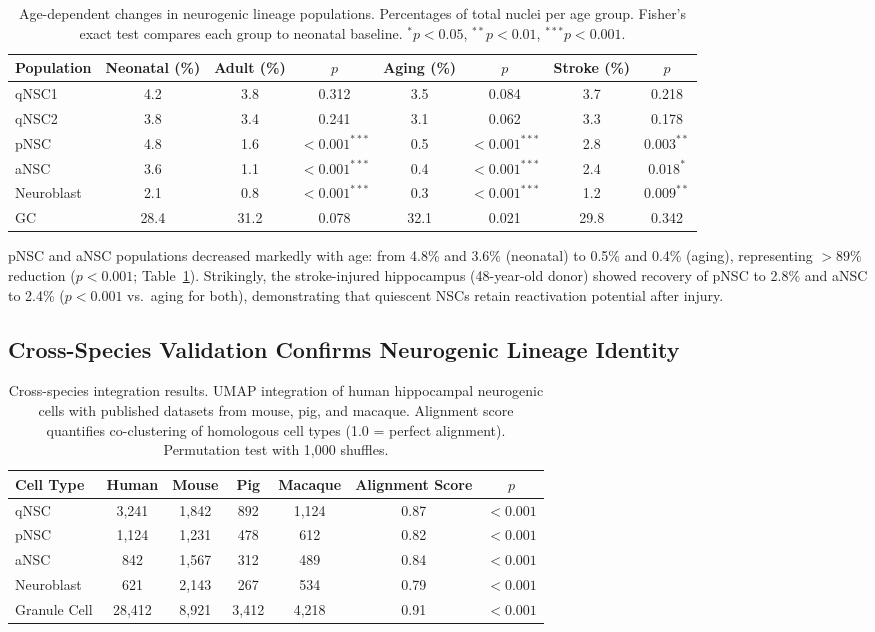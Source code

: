 \documentclass[11pt]{article}
\begin{document}
\begin{table}[H]
\centering
\caption{Age-dependent changes in neurogenic lineage populations. Percentages of total nuclei per age group. Fisher's exact test compares each group to neonatal baseline. $^{*}p < 0.05$, $^{**}p < 0.01$, $^{***}p < 0.001$.}
\label{tab:age_changes}
\begin{tabular}{lccccccc}
\toprule
Population & Neonatal (\%) & Adult (\%) & $p$ & Aging (\%) & $p$ & Stroke (\%) & $p$ \\
\midrule
qNSC1 & 4.2 & 3.8 & 0.312 & 3.5 & 0.084 & 3.7 & 0.218 \\
qNSC2 & 3.8 & 3.4 & 0.241 & 3.1 & 0.062 & 3.3 & 0.178 \\
pNSC & 4.8 & 1.6 & $< 0.001^{***}$ & 0.5 & $< 0.001^{***}$ & 2.8 & $0.003^{**}$ \\
aNSC & 3.6 & 1.1 & $< 0.001^{***}$ & 0.4 & $< 0.001^{***}$ & 2.4 & $0.018^{*}$ \\
Neuroblast & 2.1 & 0.8 & $< 0.001^{***}$ & 0.3 & $< 0.001^{***}$ & 1.2 & $0.009^{**}$ \\
GC & 28.4 & 31.2 & 0.078 & 32.1 & 0.021 & 29.8 & 0.342 \\
\bottomrule
\end{tabular}
\end{table}

pNSC and aNSC populations decreased markedly with age: from 4.8\% and 3.6\% (neonatal) to 0.5\% and 0.4\% (aging), representing $> 89\%$ reduction ($p < 0.001$; Table~\ref{tab:age_changes}). Strikingly, the stroke-injured hippocampus (48-year-old donor) showed recovery of pNSC to 2.8\% and aNSC to 2.4\% ($p < 0.001$ vs.\ aging for both), demonstrating that quiescent NSCs retain reactivation potential after injury.

\subsection{Cross-Species Validation Confirms Neurogenic Lineage Identity}

\begin{table}[H]
\centering
\caption{Cross-species integration results. UMAP integration of human hippocampal neurogenic cells with published datasets from mouse, pig, and macaque. Alignment score quantifies co-clustering of homologous cell types (1.0 = perfect alignment). Permutation test with 1,000 shuffles.}
\label{tab:cross_species}
\begin{tabular}{lcccccc}
\toprule
Cell Type & Human & Mouse & Pig & Macaque & Alignment Score & $p$ \\
\midrule
qNSC & 3,241 & 1,842 & 892 & 1,124 & 0.87 & $< 0.001$ \\
pNSC & 1,124 & 1,231 & 478 & 612 & 0.82 & $< 0.001$ \\
aNSC & 842 & 1,567 & 312 & 489 & 0.84 & $< 0.001$ \\
Neuroblast & 621 & 2,143 & 267 & 534 & 0.79 & $< 0.001$ \\
Granule Cell & 28,412 & 8,921 & 3,412 & 4,218 & 0.91 & $< 0.001$ \\
\bottomrule
\end{tabular}
\end{table}
\end{document}
